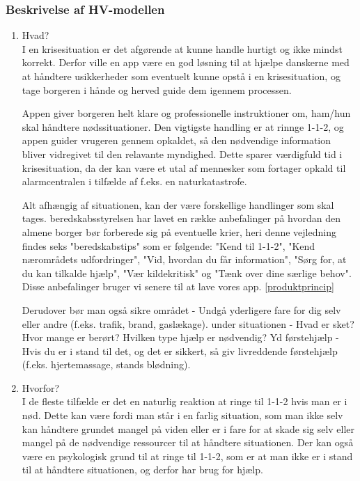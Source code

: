 \subsubsection{Beskrivelse af HV-modellen}
\begin{enumerate}
    \item Hvad? \\
    I en krisesituation er det afgørende at kunne handle hurtigt og ikke mindst korrekt. Derfor ville en app være en god løsning til at hjælpe danskerne med at håndtere usikkerheder som eventuelt kunne opstå i en krisesituation, og tage borgeren i hånde og herved guide dem igennem processen.

    Appen giver borgeren helt klare og professionelle instruktioner om, ham/hun skal håndtere nødssituationer. Den vigtigste handling er at rinnge 1-1-2, og appen guider vrugeren gennem opkaldet, så den nødvendige information bliver vidregivet til den relavante myndighed. Dette sparer værdigfuld tid i krisesituation, da der kan være et utal af mennesker som fortager opkald til alarmcentralen i tilfælde af f.eks. en naturkatastrofe.
    
    Alt afhængig af situationen, kan der være forskellige handlinger som skal tages. beredskabsstyrelsen har lavet en række anbefalinger på hvordan den almene borger bør forberede sig på eventuelle krier, heri denne vejledning findes seks "beredskabstips" som er følgende: "Kend til 1-1-2", "Kend nærområdets udfordringer", "Vid, hvordan du får information", "Sørg for, at du kan tilkalde hjælp", "Vær kildekritisk" og "Tænk over dine særlige behov".  Disse anbefalinger bruger vi senere til at lave vores app. \ref{produktprincip}

    Derudover bør man også sikre området - Undgå yderligere fare for dig selv eller andre (f.eks. trafik, brand, gaslækage). under situationen - Hvad er sket? Hvor mange er berørt? Hvilken type hjælp er nødvendig? Yd førstehjælp - Hvis du er i stand til det, og det er sikkert, så giv livreddende førstehjælp (f.eks. hjertemassage, stands blødning).
    
    \item Hvorfor? \\
    I de fleste tilfælde er det en naturlig reaktion at ringe til 1-1-2 hvis man er i nød. Dette kan være fordi man står i en farlig situation, som man ikke selv kan håndtere grundet mangel på viden eller er i fare for at skade sig selv eller mangel på de nødvendige ressourcer til at håndtere situationen. Der kan også være en psykologisk grund til at ringe til 1-1-2, som er at man ikke er i stand til at håndtere situationen, og derfor har brug for hjælp.


\end{enumerate}
